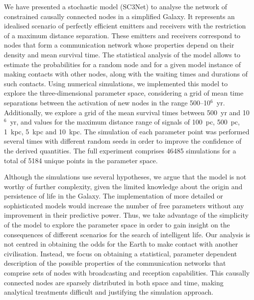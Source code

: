 \documentclass[crop]{CSLB}
\begin{document}
We have presented a stochastic model (SC3Net) to analyse the network
of constrained causally connected nodes in a simplified Galaxy.
%
It represents an idealised scenario of perfectly efficient emitters
and receivers with the restriction of a maximum distance separation.
%
These emitters and receivers correspond to nodes that form a
communication network whose properties depend on their density and
mean survival time.
%
The statistical analysis of the model allows to estimate the
probabilities for a random node and for a given model instance of
making contacts with other nodes, along with the waiting times and
durations of such contacts.
%
Using numerical simulations, we implemented this model to explore the
three-dimensional parameter space, considering a grid of mean time
separations between the activation of new nodes in the range
500--10$^6$~yr.
%
Additionally, we explore a grid of the mean survival times between
500~yr and 10$^6$~yr, and values for the maximum distance range of
signals of 100~pc, 500~pc, 1~kpc, 5~kpc and 10~kpc.
%
The simulation of each parameter point was performed several times
with different random seeds in order to improve the confidence of the
derived quantities.
%
The full experiment comprises 46485 simulations for a total of 5184
unique points in the parameter space.



Although the simulations use several hypotheses, we argue that the
model is not worthy of further complexity, given the limited knowledge
about the origin and persistence of life in the Galaxy.
%
The implementation of more detailed or sophisticated models would
increase the number of free parameters without any improvement in
their predictive power.
%
Thus, we take advantage of the simplicity of the model to explore the
parameter space in order to gain insight on the consequences of
different scenarios for the search of intelligent life.
%
Our analysis is not centred in obtaining the odds for the Earth to
make contact with another civilisation.
%
Instead, we focus on obtaining a statistical, parameter dependent
description of the possible properties of the communication networks
that comprise sets of nodes with broadcasting and reception
capabilities.
%
This causally connected nodes are sparsely distributed in both space
and time, making analytical treatments difficult and justifying the
simulation approach.
\end{document}
